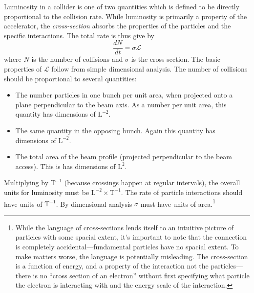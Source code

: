Luminosity in a collider is one of two quantities which is defined to be directly proportional to the collision rate.
While luminosity is primarily a property of the accelerator, the \emph{cross-section} absorbs the properties of the particles and the specific interactions.
The total rate is thus give by
\begin{equation}
  \frac{d N}{d t} = \sigma \mathcal{L}
  \label{eq:lumi-cross-section}
\end{equation}
where $N$ is the number of collisions and $\sigma$ is the cross-section.
The basic properties of $\mathcal{L}$ follow from simple dimensional analysis.
The number of collisions should be proportional to several quantities:
\begin{itemize}
\item The number particles in one bunch per unit area, when projected onto a plane perpendicular to the beam axis. As a number per unit area, this quantity has dimensions of $\mathrm{L}^{-2}$.
\item The same quantity in the opposing bunch. Again this quantity has dimensions of $\mathrm{L}^{-2}$.
\item The total area of the beam profile (projected perpendicular to the beam access). This is has dimensions of $\mathrm{L}^2$.
\end{itemize}
Multiplying by $\mathrm{T}^{-1}$ (because crossings happen at regular intervals), the overall units for luminosity must be $\mathrm{L}^{-2} \times \mathrm{T}^{-1}$.
The rate of particle interactions should have units of $\mathrm{T}^{-1}$.
By dimensional analysis $\sigma$ must have units of area.\footnote{While the language of cross-sections lends itself to an intuitive picture of particles with some spacial extent, it's important to note that the connection is completely accidental---fundamental particles have no spacial extent.
To make matters worse, the language is potentially misleading.
The cross-section is a function of energy, and a property of the interaction not the particles---there is no ``cross section of an electron'' without first specifying what particle the electron is interacting with and the energy scale of the interaction.}

